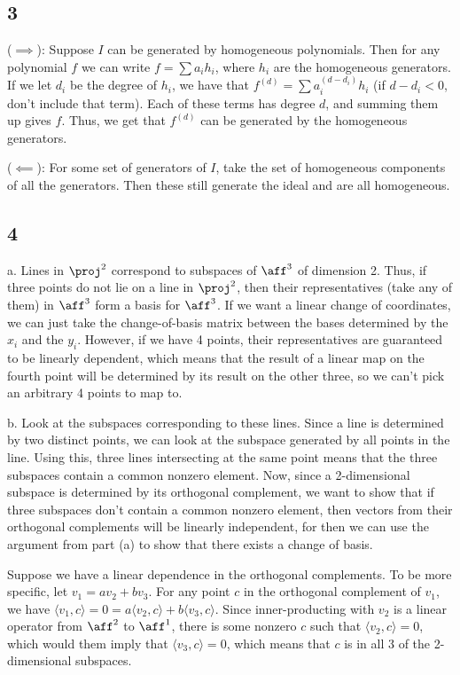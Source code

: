\documentclass{article}
\begin{document}
\subsection*{3}
($\implies$): Suppose $I$ can be generated by homogeneous polynomials. Then for any polynomial $f$ we can write $f=\sum a_ih_i$, where $h_i$ are the homogeneous generators. If we let $d_i$ be the degree of $h_i$, we have that $f^{(d)}=\sum a_i^{(d-d_i)}h_i$ (if $d-d_i<0$, don't include that term). Each of these terms has degree $d$, and summing them up gives $f$. Thus, we get that $f^{(d)}$ can be generated by the homogeneous generators.

($\impliedby$): For some set of generators of $I$, take the set of homogeneous components of all the generators. Then these still generate the ideal and are all homogeneous.
\subsection*{4}
a. Lines in $\proj^2$ correspond to subspaces of $\aff^3$ of dimension 2. Thus, if three points do not lie on a line in $\proj^2$, then their representatives (take any of them) in $\aff^3$ form a basis for $\aff^3$. If we want a linear change of coordinates, we can just take the change-of-basis matrix between the bases determined by the $x_i$ and the $y_i$. However, if we have 4 points, their representatives are guaranteed to be linearly dependent, which means that the result of a linear map on the fourth point will be determined by its result on the other three, so we can't pick an arbitrary 4 points to map to.

b. Look at the subspaces corresponding to these lines. Since a line is determined by two distinct points, we can look at the subspace generated by all points in the line. Using this, three lines intersecting at the same point means that the three subspaces contain a common nonzero element. Now, since a 2-dimensional subspace is determined by its orthogonal complement, we want to show that if three subspaces don't contain a common nonzero element, then vectors from their orthogonal complements will be linearly independent, for then we can use the argument from part (a) to show that there exists a change of basis. 

Suppose we have a linear dependence in the orthogonal complements. To be more specific, let $v_1=av_2+bv_3$. For any point $c$ in the orthogonal complement of $v_1$, we have $\langle v_1,c\rangle=0=a\langle v_2,c\rangle+b\langle v_3,c\rangle$. Since inner-producting with $v_2$ is a linear operator from $\aff^2$ to $\aff^1$, there is some nonzero $c$ such that $\langle v_2,c\rangle=0$, which would them imply that $\langle v_3,c\rangle=0$, which means that $c$ is in all 3 of the 2-dimensional subspaces.
\end{document}
